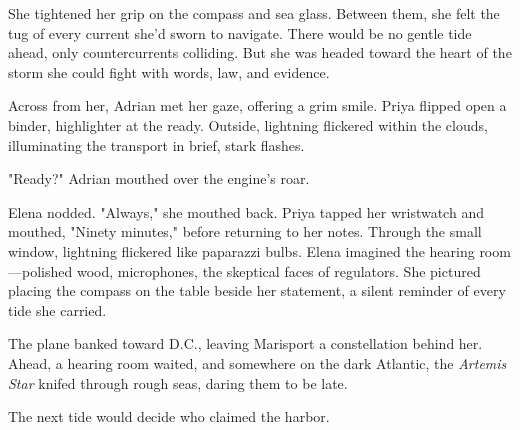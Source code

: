 She tightened her grip on the compass and sea glass. Between them, she felt the tug of every current she'd sworn to navigate. There would be no gentle tide ahead, only countercurrents colliding. But she was headed toward the heart of the storm she could fight with words, law, and evidence.

Across from her, Adrian met her gaze, offering a grim smile. Priya flipped open a binder, highlighter at the ready. Outside, lightning flickered within the clouds, illuminating the transport in brief, stark flashes.

"Ready?" Adrian mouthed over the engine's roar.

Elena nodded. "Always," she mouthed back. Priya tapped her wristwatch and mouthed, "Ninety minutes," before returning to her notes. Through the small window, lightning flickered like paparazzi bulbs. Elena imagined the hearing room—polished wood, microphones, the skeptical faces of regulators. She pictured placing the compass on the table beside her statement, a silent reminder of every tide she carried.

The plane banked toward D.C., leaving Marisport a constellation behind her. Ahead, a hearing room waited, and somewhere on the dark Atlantic, the \textit{Artemis Star} knifed through rough seas, daring them to be late.

The next tide would decide who claimed the harbor.
